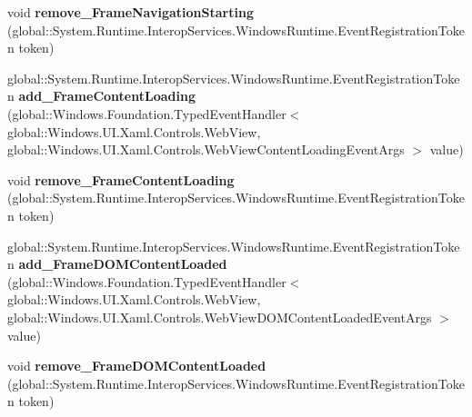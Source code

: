 \begin{DoxyCompactItemize}
\item 
\mbox{\label{interface_windows_1_1_u_i_1_1_xaml_1_1_controls_1_1_i_web_view2_a93262ec1ba7af52f7ad156f65df18af8}} 
void {\bfseries remove\+\_\+\+Frame\+Navigation\+Starting} (global\+::\+System.\+Runtime.\+Interop\+Services.\+Windows\+Runtime.\+Event\+Registration\+Token token)
\item 
\mbox{\label{interface_windows_1_1_u_i_1_1_xaml_1_1_controls_1_1_i_web_view2_a131ab872c36d8541d45eadfe0d090bc5}} 
global\+::\+System.\+Runtime.\+Interop\+Services.\+Windows\+Runtime.\+Event\+Registration\+Token {\bfseries add\+\_\+\+Frame\+Content\+Loading} (global\+::\+Windows.\+Foundation.\+Typed\+Event\+Handler$<$ global\+::\+Windows.\+U\+I.\+Xaml.\+Controls.\+Web\+View, global\+::\+Windows.\+U\+I.\+Xaml.\+Controls.\+Web\+View\+Content\+Loading\+Event\+Args $>$ value)
\item 
\mbox{\label{interface_windows_1_1_u_i_1_1_xaml_1_1_controls_1_1_i_web_view2_a5b4a40e6d22653be9ab3f75aed948798}} 
void {\bfseries remove\+\_\+\+Frame\+Content\+Loading} (global\+::\+System.\+Runtime.\+Interop\+Services.\+Windows\+Runtime.\+Event\+Registration\+Token token)
\item 
\mbox{\label{interface_windows_1_1_u_i_1_1_xaml_1_1_controls_1_1_i_web_view2_a7a047d6e440aef821db8493d115765ab}} 
global\+::\+System.\+Runtime.\+Interop\+Services.\+Windows\+Runtime.\+Event\+Registration\+Token {\bfseries add\+\_\+\+Frame\+D\+O\+M\+Content\+Loaded} (global\+::\+Windows.\+Foundation.\+Typed\+Event\+Handler$<$ global\+::\+Windows.\+U\+I.\+Xaml.\+Controls.\+Web\+View, global\+::\+Windows.\+U\+I.\+Xaml.\+Controls.\+Web\+View\+D\+O\+M\+Content\+Loaded\+Event\+Args $>$ value)
\item 
\mbox{\label{interface_windows_1_1_u_i_1_1_xaml_1_1_controls_1_1_i_web_view2_a9a0644d03c587152ca5463dd2d8dfff8}} 
void {\bfseries remove\+\_\+\+Frame\+D\+O\+M\+Content\+Loaded} (global\+::\+System.\+Runtime.\+Interop\+Services.\+Windows\+Runtime.\+Event\+Registration\+Token token)
\item 

\end{DoxyCompactItemize}
